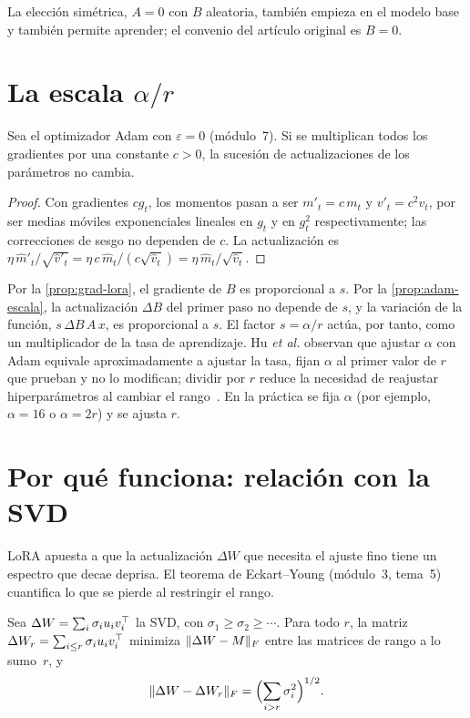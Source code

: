 La elección simétrica, $A=0$ con $B$ aleatoria, también empieza en el modelo base y también permite aprender; el convenio del artículo original es $B=0$.

\section{La escala \texorpdfstring{$\alpha/r$}{alpha/r}}

\begin{proposicion}\label{prop:adam-escala}
Sea el optimizador Adam con $\varepsilon=0$ (módulo~7). Si se multiplican todos los gradientes por una constante $c>0$, la sucesión de actualizaciones de los parámetros no cambia.
\end{proposicion}

\begin{proof}
Con gradientes $cg_t$, los momentos pasan a ser $m'_t=c\,m_t$ y $v'_t=c^{2}v_t$, por ser medias móviles exponenciales lineales en $g_t$ y en $g_t^{2}$ respectivamente; las correcciones de sesgo no dependen de $c$. La actualización es $\eta\,\hat m'_t/\sqrt{\hat v'_t}=\eta\,c\,\hat m_t/(c\sqrt{\hat v_t})=\eta\,\hat m_t/\sqrt{\hat v_t}$.
\end{proof}

Por la \cref{prop:grad-lora}, el gradiente de $B$ es proporcional a $s$. Por la \cref{prop:adam-escala}, la actualización $\Delta B$ del primer paso no depende de $s$, y la variación de la función, $s\,\Delta B\,A\,x$, es proporcional a $s$. El factor $s=\alpha/r$ actúa, por tanto, como un multiplicador de la tasa de aprendizaje. Hu \emph{et al.} observan que ajustar $\alpha$ con Adam equivale aproximadamente a ajustar la tasa, fijan $\alpha$ al primer valor de $r$ que prueban y no lo modifican; dividir por $r$ reduce la necesidad de reajustar hiperparámetros al cambiar el rango~\cite[§4.1]{hu-lora}. En la práctica se fija $\alpha$ (por ejemplo, $\alpha=16$ o $\alpha=2r$) y se ajusta $r$.

\section{Por qué funciona: relación con la SVD}

LoRA apuesta a que la actualización $\Delta W$ que necesita el ajuste fino tiene un espectro que decae deprisa. El teorema de Eckart--Young (módulo~3, tema~5) cuantifica lo que se pierde al restringir el rango.

\begin{teorema}\label{teo:ey}
Sea $\Delta W=\sum_i\sigma_iu_iv_i^{\top}$ la SVD, con $\sigma_1\ge\sigma_2\ge\cdots$. Para todo $r$, la matriz $\Delta W_r=\sum_{i\le r}\sigma_iu_iv_i^{\top}$ minimiza $\lVert\Delta W-M\rVert_F$ entre las matrices de rango a lo sumo~$r$, y
\[
\lVert\Delta W-\Delta W_r\rVert_F=\Bigl(\sum_{i>r}\sigma_i^{2}\Bigr)^{1/2}.
\]
\end{teorema}

